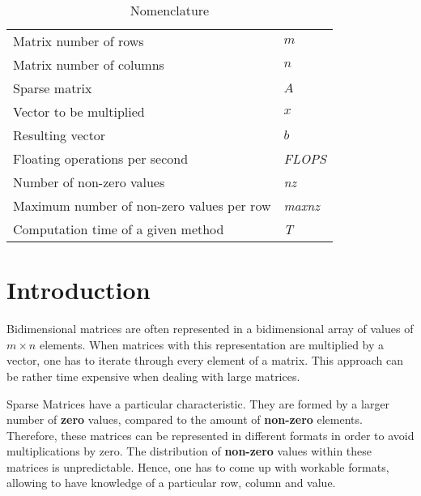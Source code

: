 \documentclass[12pt]{article}
\begin{document}

\begin{table}[tb]
\caption{Nomenclature}
\label{tab:notation}
\centering
\def\arraystretch{1.5}
\begin{tabular}{ll}
Matrix number of rows & $m$\\
Matrix number of columns & $n$\\
Sparse matrix & $A$\\
Vector to be multiplied & $x$\\
Resulting vector & $b$\\
Floating operations per second & \textit{FLOPS} \\
Number of non-zero values & \textit{nz} \\
Maximum number of non-zero values per row & \textit{maxnz} \\
Computation time of a given method & \textit{T} \\
\end{tabular}
\end{table}


\section*{Introduction}

\par Bidimensional matrices are often represented in a bidimensional array of values of $m \times n$ elements. When matrices with this representation are multiplied by a vector, one has to iterate through every element of a matrix. This approach can be rather time expensive when dealing with large matrices.
\par Sparse Matrices have a particular characteristic. They are formed by a larger number of \textbf{zero} values, compared to the amount of \textbf{non-zero} elements. Therefore, these matrices can be represented in different formats in order to avoid multiplications by zero.\cite{sparse-gpu} The distribution of \textbf{non-zero} values within these matrices is unpredictable. Hence, one has to come up with workable formats, allowing to have knowledge of a particular row, column and value.
\end{document}
